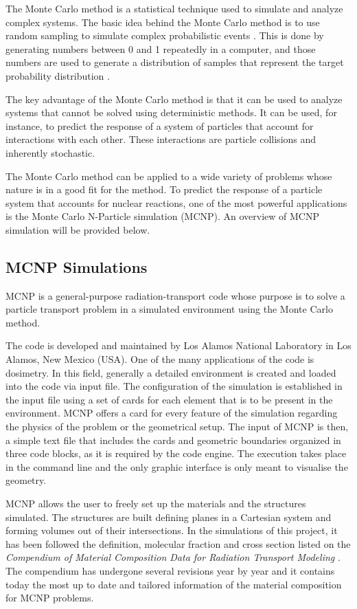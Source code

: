\label{section: Monte Carlo Method}
The Monte Carlo method is a statistical technique used to simulate and analyze complex systems. The basic idea behind the Monte Carlo method is to use random sampling to simulate complex probabilistic events \cite{MonteCarloMethods}. This is done by generating numbers between 0 and 1 repeatedly in a computer, and those numbers are used to generate a distribution of samples that represent the target probability distribution \cite{MonteCarloMethods}.

The key advantage of the Monte Carlo method is that it can be used to analyze systems that cannot be solved using deterministic methods. It can be used, for instance, to predict the response of a system of particles that account for interactions with each other. These interactions are particle collisions and inherently stochastic.

The Monte Carlo method can be applied to a wide variety of problems whose nature is in a good fit for the method. To predict the response of a particle system that accounts for nuclear reactions, one of the most powerful applications is the Monte Carlo N-Particle simulation (MCNP). An overview of MCNP simulation will be provided below.


\subsection{MCNP Simulations}
\label{subsection:MCNP Simulations}
MCNP is a general-purpose radiation-transport code whose purpose is to solve a particle transport problem in a simulated environment using the Monte Carlo method. \cite{mcnp5Manual}

The code is developed and maintained by Los Alamos National Laboratory in Los Alamos, New Mexico (USA). One of the many applications of the code is dosimetry. In this field, generally a detailed environment is created and loaded into the code via input file. The configuration of the simulation is established in the input file using a set of cards for each element that is to be present in the environment. MCNP offers a card for every feature of the simulation regarding the physics of the problem or the geometrical setup. The input of MCNP is then, a simple text file that includes the cards and geometric boundaries organized in three code blocks, as it is required by the code engine. The execution takes place in the command line and the only graphic interface is only meant to visualise the geometry.

MCNP allows the user to freely set up the materials and the structures simulated. The structures are built defining planes in a Cartesian system and forming volumes out of their intersections. In the simulations of this project, it has been followed the definition, molecular fraction and cross section listed on the \textit{Compendium of Material Composition Data for Radiation Transport Modeling} \cite{matcomposition}. The compendium has undergone several revisions year by year and it contains today the most up to date and tailored information of the material composition for MCNP problems. 

